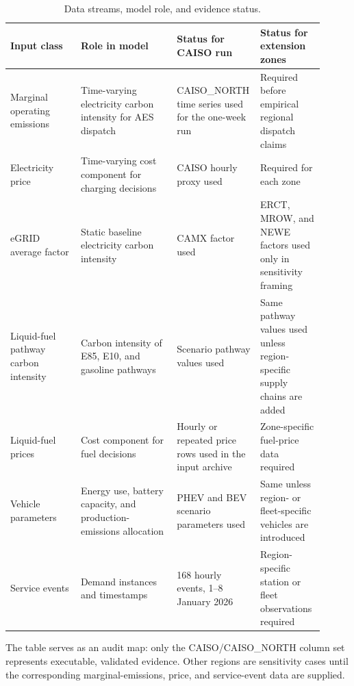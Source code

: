 \documentclass[cleantechnol,article,submit,pdftex,moreauthors]{Definitions/mdpi}
\begin{document}
\begin{table}[htbp]
	\centering
	\begin{threeparttable}
		\caption{Data streams, model role, and evidence status.}
		\label{tab:data_streams}
		\scriptsize
		\begin{tabular}{p{0.22\linewidth}p{0.30\linewidth}p{0.19\linewidth}p{0.20\linewidth}}
			\toprule
			Input class & Role in model & Status for CAISO run & Status for extension zones \\
			\midrule
			Marginal operating emissions & Time-varying electricity carbon intensity for AES dispatch & CAISO\_NORTH time series used for the one-week run & Required before empirical regional dispatch claims \\
			Electricity price & Time-varying cost component for charging decisions & CAISO hourly proxy used & Required for each zone \\
			eGRID average factor & Static baseline electricity carbon intensity & CAMX factor used & ERCT, MROW, and NEWE factors used only in sensitivity framing \\
			Liquid-fuel pathway carbon intensity & Carbon intensity of E85, E10, and gasoline pathways & Scenario pathway values used & Same pathway values used unless region-specific supply chains are added \\
			Liquid-fuel prices & Cost component for fuel decisions & Hourly or repeated price rows used in the input archive & Zone-specific fuel-price data required \\
			Vehicle parameters & Energy use, battery capacity, and production-emissions allocation & PHEV and BEV scenario parameters used & Same unless region- or fleet-specific vehicles are introduced \\
			Service events & Demand instances and timestamps & 168 hourly events, 1--8 January 2026 & Region-specific station or fleet observations required \\
			\bottomrule
		\end{tabular}
		\begin{tablenotes}
			\footnotesize
			\item The table serves as an audit map: only the CAISO/CAISO\_NORTH column set represents executable, validated evidence. Other regions are sensitivity cases until the corresponding marginal-emissions, price, and service-event data are supplied.
		\end{tablenotes}
	\end{threeparttable}
\end{table}
\end{document}
